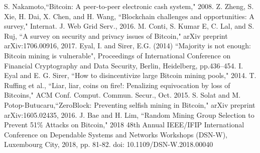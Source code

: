 \documentclass[conference]{IEEEtran}
\begin{document}
\begin{thebibliography}{00}

 S. Nakamoto,``Bitcoin: A peer-to-peer electronic cash system," 2008.
 Z. Zheng, S. Xie, H. Dai, X. Chen, and H. Wang, ``Blockchain challenges
and opportunities: A survey," Internat. J. Web Grid Serv., 2016.
M. Conti, S. Kumar E, C. Lal, and S. Ruj, ``A survey on security and privacy issues of Bitcoin," arXiv preprint arXiv:1706.00916, 2017.
 Eyal, I. and Sirer, E.G. (2014) ``Majority is not enough: Bitcoin mining is vulnerable", Proceedings
of International Conference on Financial Cryptography and Data Security, Berlin, Heidelberg,
pp.436–454.
 I. Eyal and E. G. Sirer, ``How to disincentivize large Bitcoin mining pools," 2014.
 T. Ruffing et al., “Liar, liar, coins on fire!: Penalizing equivocation by loss of Bitcoins," ACM Conf. Comput. Commun. Secur., Oct. 2015.
 S. Solat and M. Potop-Butucaru,``ZeroBlock: Preventing selfish mining in Bitcoin," arXiv preprint arXiv:1605.02435, 2016.
 J. Bae and H. Lim, ``Random Mining Group Selection to Prevent 51\% Attacks on Bitcoin," 2018 48th Annual IEEE/IFIP International Conference on Dependable Systems and Networks Workshops (DSN-W), Luxembourg City, 2018, pp. 81-82.
doi: 10.1109/DSN-W.2018.00040
\end{thebibliography}
\vspace{12pt}
\color{red}
\end{document}
